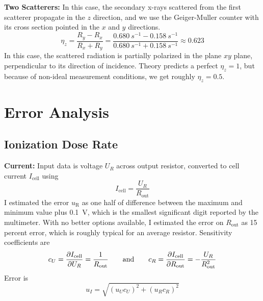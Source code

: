 \documentclass[11pt, a4paper]{article}
\newcommand{\eqtext}[1]{\qquad \text{#1} \qquad}
\begin{document}
\textbf{Two Scatterers:}
In this case, the secondary x-rays scattered from the first scatterer propagate in the $ z $ direction, and we use the Geiger-Muller counter with its cross section pointed in the $ x $ and $ y $ directions. 
\begin{equation*}
	\eta_{z} = \frac{R_{y} - R_{x}}{R_{x} + R_{y}} = \frac{\SI{0.680}{s^{-1}} - \SI{0.158}{s^{-1}} }{\SI{0.680}{s^{-1}} + \SI{0.158}{s^{-1}}} \approx 0.623
\end{equation*}
In this case, the scattered radiation is partially polarized in the plane $ xy $ plane, perpendicular to its direction of incidence. Theory predicts a perfect $ \eta_{z} = 1 $, but because of non-ideal measurement conditions, we get roughly $ \eta_{z} = 0.5 $.



\section{Error Analysis}
\subsection{Ionization Dose Rate}
\textbf{Current:} Input data is voltage $ U_{R} $ across output resistor, converted to cell current $ I_{\text{cell}} $ using
\begin{equation*}
	I_{\text{cell}} = \frac{U_{R}}{R_{\text{out}}}
\end{equation*}
I estimated the error $ u_{\text{R}} $ as one half of difference between the maximum and minimum value plus  \SI{0.1}{\volt}, which is the smallest significant digit reported by the multimeter. With no better options available, I estimated the error on $ R_{\text{out}} $ as 15 percent error, which is roughly typical for an average resistor. Sensitivity coefficients are
\begin{equation*}
	c_{U} = \pdv{I_{\text{cell}}}{U_{R}} = \frac{1}{R_{\text{out}}} \eqtext{and} c_{R} = \pdv{I_{\text{cell}}}{R_{\text{out}}} = -\frac{U_{R}}{R_{\text{out}}^{2}}
\end{equation*}
Error is 
\begin{equation*}
	u_{I} = \sqrt{(u_{U}c_{U})^{2} + (u_{R}c_{R})^{2}}
\end{equation*}
\end{document}
